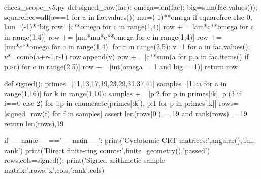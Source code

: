 \begin{filecontents*}[overwrite]{check_scope_v5.py}
def signed_row(fac):
    omega=len(fac); big=sum(fac.values()); squarefree=all(a==1 for a in fac.values())
    mu=(-1)**omega if squarefree else 0; lam=(-1)**big
    row=[c**omega for c in range(1,4)]
    row += [lam*c**omega for c in range(1,4)]
    row += [mu*mu*c**omega for c in range(1,4)]
    row += [mu*c**omega for c in range(1,4)]
    for r in range(2,5):
        v=1
        for a in fac.values(): v*=comb(a+r-1,r-1)
        row.append(v)
    row += [c**sum(a for p,a in fac.items() if p>c) for c in range(2,5)]
    row += [int(omega==1 and big==1)]
    return row

def signed():
    primes=[11,13,17,19,23,29,31,37,41]
    samples=[{11:a} for a in range(1,16)]
    for k in range(1,10):
        samples += [{p:2 for p in primes[:k]},
                    {p:(3 if i==0 else 2) for i,p in enumerate(primes[:k])},
                    {p:1 for p in primes[:k]}]
    rows=[signed_row(f) for f in samples]
    assert len(rows[0])==19 and rank(rows)==19
    return len(rows),19

if __name__=='__main__':
    print('Cyclotomic CRT matrices:',angular(),'full rank')
    print('Direct finite-ring counts:',finite_geometry(),'passed')
    rows,cols=signed(); print('Signed arithmetic sample matrix:',rows,'x',cols,'rank',cols)

\end{filecontents*}
